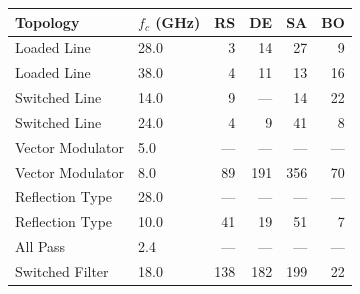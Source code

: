 \begin{tabular}{llrrrr}
\toprule
Topology & $f_c$ (GHz) & RS & DE & SA & BO \\
\midrule
Loaded Line & 28.0 & 3 & 14 & 27 & 9 \\
Loaded Line & 38.0 & 4 & 11 & 13 & 16 \\
Switched Line & 14.0 & 9 & — & 14 & 22 \\
Switched Line & 24.0 & 4 & 9 & 41 & 8 \\
Vector Modulator & 5.0 & — & — & — & — \\
Vector Modulator & 8.0 & 89 & 191 & 356 & 70 \\
Reflection Type & 28.0 & — & — & — & — \\
Reflection Type & 10.0 & 41 & 19 & 51 & 7 \\
All Pass & 2.4 & — & — & — & — \\
Switched Filter & 18.0 & 138 & 182 & 199 & 22 \\
\bottomrule
\end{tabular}